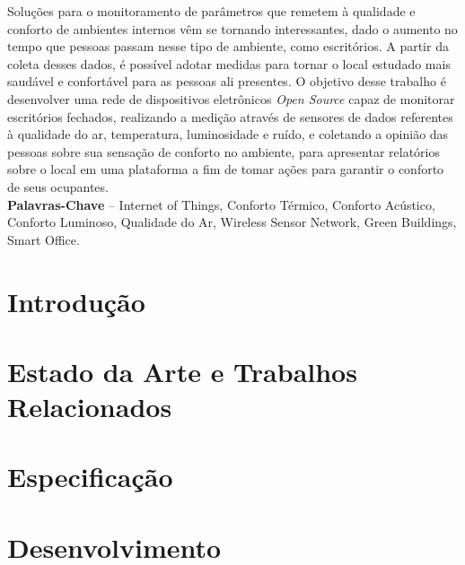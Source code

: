 \documentclass[]{politex}
\begin{document}
\capa

\falsafolhaderosto

\folhaderosto



\begin{resumo}
Soluções para o monitoramento de parâmetros que remetem à qualidade e conforto de ambientes internos vêm se tornando interessantes, dado o aumento no tempo que pessoas passam nesse tipo de ambiente, como escritórios. A partir da coleta desses dados, é possível adotar medidas para tornar o local estudado mais saudável e confortável para as pessoas ali presentes. O objetivo desse trabalho é desenvolver uma rede de dispositivos eletrônicos \textit{Open Source} capaz de monitorar escritórios fechados, realizando a medição através de sensores de dados referentes à qualidade do ar, temperatura, luminosidade e ruído, e coletando a opinião das pessoas sobre sua sensação de conforto no ambiente, para apresentar relatórios sobre o local em uma plataforma a fim de tomar ações para garantir o conforto de seus ocupantes. 
%
\\[3\baselineskip]
%
\textbf{Palavras-Chave} -- Internet of Things, Conforto Térmico, Conforto Acústico, Conforto Luminoso, Qualidade do Ar, Wireless Sensor Network, Green Buildings, Smart Office.
\end{resumo}



\sumario


\chapter{Introdução}


\chapter{Estado da Arte e Trabalhos Relacionados} %


\chapter{Especificação}


\chapter{Desenvolvimento}

\end{document}
